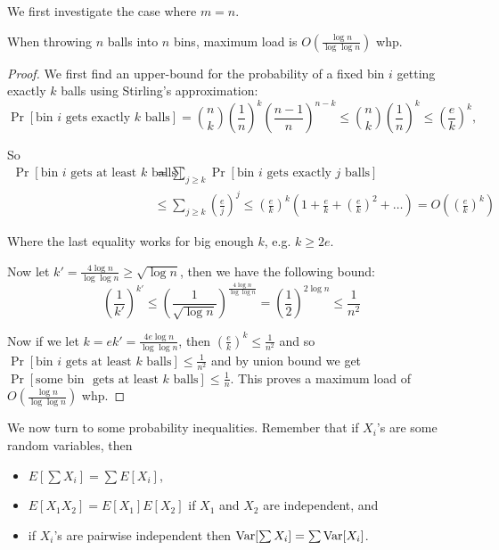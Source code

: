 We first investigate the case where $m = n$. 
\begin{proposition} When throwing $n$ balls into $n$ bins, maximum load is $O(\frac{\log n}{\log \log n})$ whp.
\end{proposition} 
\begin{proof}
We first find an upper-bound for the probability of a fixed bin $i$ getting exactly $k$ balls using Stirling's approximation:
$$\Pr[\text{bin } i \text{ gets exactly } k \text{ balls}] = \binom{n}{k} \left( \frac{1}{n}\right)^k \left( \frac{n-1}{n}\right)^{n-k} \leq \binom{n}{k} \left( \frac{1}{n}\right)^k \leq \left( \frac{e}{k} \right)^k,$$

So 
\begin{align*}
\Pr[\text{bin } i \text{ gets at least } k \text{ balls}] &= \sum_{j \geq k} \Pr[\text{bin } i \text{ gets exactly } j \text{ balls}] \\
  &\leq
\sum_{j \geq k} \left( \frac{e}{j} \right)^j  \leq \left( \frac{e}{k}\right)^k \left( 1 + \frac{e}{k} + \left(\frac{e}{k} \right)^2 + \ldots \right) = O\left( \left( \frac{e}{k} \right)^k \right)
\end{align*}

Where the last equality works for big enough $k$, e.g. $k \geq 2 e$.

Now let $k' = \frac{4 \log n}{\log \log n} \geq \sqrt{\log n}$, then we have the following bound:
$$
\left( \frac{1}{k'} \right)^{k'} \leq \left( \frac{1}{\sqrt{\log n}} \right)^{\frac{4 \log n}{\log \log n}} = \left( \frac{1}{2} \right) ^{2 \log n} \leq \frac{1}{n^2}
$$

Now if we let $k = e k' = \frac{4 e \log n}{\log \log n}$, then $\left( \frac{e}{k}\right)^k \leq \frac{1}{n^2}$ and so $\Pr[\text{bin } i \text{ gets at least } k \text{ balls}] \leq \frac{1}{n^2}$ and by union bound we get $\Pr[\text{some bin } \text{ gets at least } k \text{ balls}] \leq \frac{1}{n}$. This proves a maximum load of $O\left( \frac{\log n}{\log \log n} \right)$ whp.
\end{proof}

We now turn to some probability inequalities. Remember that if $X_i$'s are some random variables, then
\begin{itemize}
\item $E[\sum X_i] = \sum E[X_i]$,
\item $E[X_1 X_2] = E[X_1] E[X_2]$ if $X_1$ and $X_2$ are independent, and
\item if $X_i$'s are pairwise independent then $\mathrm{Var} [\sum X_i] = \sum \mathrm{Var} [X_i]$.
\end{itemize}

